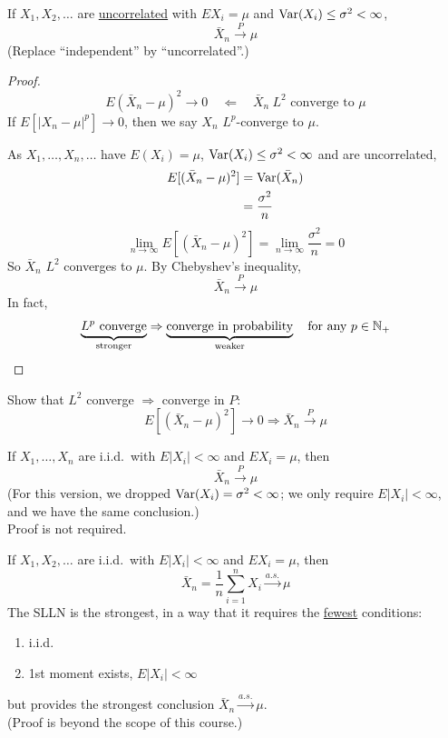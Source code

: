 \begin{theorem}
    If $X_1, X_2, \dots$ are \underline{uncorrelated} with $EX_i = \mu$ and $\operatorname{Var}(X_i) \leq \sigma^2 < \infty$,
    \[\bar{X}_n \overset{P}{\longrightarrow} \mu\]
    (Replace ``independent'' by ``uncorrelated''.)
    \begin{proof}
        \[E(\bar{X}_n - \mu)^2 \to 0 \quad \Leftarrow \quad \bar{X}_n \ L^2 \text{ converge to } \mu\]
        If $E[|X_n - \mu|^p] \to 0$, then we say $X_n$ $L^p$-converge to $\mu$.

        As $X_1, \dots, X_n, \dots$ have $E(X_i) = \mu$, $\operatorname{Var}(X_i) \leq \sigma^2 < \infty$ and are uncorrelated,
        \begin{align*}
            E[(\bar{X}_n - \mu)^2] &= \operatorname{Var}(\bar{X}_n)\\
            &= \frac{\sigma^2}{n}
        \end{align*}
        \[\lim_{n\to\infty} E[(\bar{X}_n - \mu)^2] = \lim_{n\to\infty}\frac{\sigma^2}{n} = 0\]
        So $\bar{X}_n$ $L^2$ converges to $\mu$. By Chebyshev's inequality,
        \[\bar{X}_n \overset{P}{\longrightarrow} \mu\]
        In fact,
        \[\underbrace{L^p \text{ converge}}_{\text{stronger}} \Rightarrow \underbrace{\text{converge in probability}}_{\text{weaker}} \quad \text{for any } p \in \mathbb{N}_+\]
    \end{proof}
\end{theorem}

\begin{exercise}[][\relax]
    Show that $L^2$ converge $\Rightarrow$ converge in $P$:
    \[E[(\bar{X}_n - \mu)^2] \to 0 \Rightarrow \bar{X}_n \overset{P}{\longrightarrow} \mu\]
\end{exercise}

\begin{theorem}
    If $X_1, \dots, X_n$ are i.i.d.\ with $E|X_i| < \infty$ and $EX_i = \mu$, then
    \[\bar{X}_n \overset{P}{\longrightarrow} \mu\]
    (For this version, we dropped $\operatorname{Var}(X_i) = \sigma^2 < \infty$; we only require $E|X_i| < \infty$, and we have the same conclusion.)
    \\Proof is not required.
\end{theorem}

\begin{theorem}
    If $X_1, X_2, \dots$ are i.i.d.\ with $E|X_i| < \infty$ and $EX_i = \mu$, then
    \[\bar{X}_n = \frac{1}{n}\sum_{i=1}^n X_i \overset{a.s.}{\longrightarrow} \mu\]
    The SLLN is the strongest, in a way that it requires the \underline{fewest} conditions:
    \begin{enumerate}
        \item i.i.d.
        \item 1st moment exists, $E|X_i| < \infty$
    \end{enumerate}
    but provides the strongest conclusion $\bar{X}_n \overset{a.s.}{\longrightarrow} \mu$.
    \\(Proof is beyond the scope of this course.)
\end{theorem}


